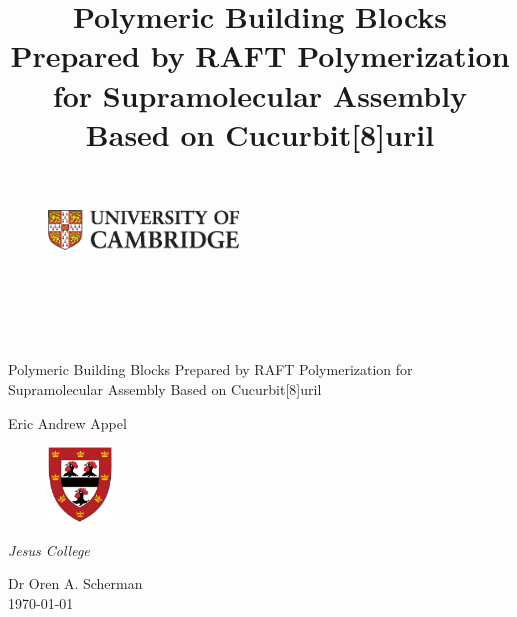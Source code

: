 \documentclass[a4wide,12pt]{report} %
\title{Polymeric Building Blocks Prepared by RAFT Polymerization for Supramolecular Assembly Based on Cucurbit[8]uril}
\begin{document}
\begin{titlepage}


\begin{figure}[h]
\begin{flushright}
\includegraphics[width=0.45\textwidth]{Images/CUnibig.eps}
\end{flushright}
\end{figure}
\begin{flushright}
 \\
 \\
 \\
 \\
\end{flushright}



\vspace*{0.5cm}
\begin{center}
\Huge {Polymeric Building Blocks Prepared by RAFT Polymerization for Supramolecular Assembly Based on Cucurbit[8]uril}
\end{center}
\vspace{0.75cm}
\begin{center}
\Large {Eric Andrew Appel} \\[3pt]
\end{center}


\begin{figure}[h]
\begin{center}
\includegraphics[width=0.15\textwidth]{Images/jesus.eps}
\end{center}
\end{figure}

\vspace{-1.2cm}
\begin{center}
\Large {\it Jesus College}\\
\end{center}

\vspace{0.25cm}
\begin{center}
\Large {Dr Oren A. Scherman}\\
\today
\end{center}


\end{titlepage}
\end{document}
